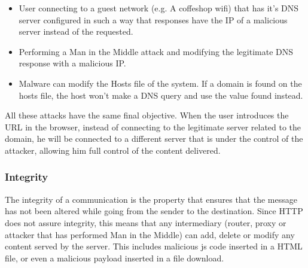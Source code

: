 \begin{itemize}
	\item User connecting to a guest network (e.g. A coffeshop wifi) that has it's DNS server configured in such a way that responses have the IP of a malicious server instead of the requested.
	\item Performing a Man in the Middle attack and modifying the legitimate DNS response with a malicious IP.
	\item Malware can modify the Hosts file of the system. If a domain is found on the hosts file, the host won't make a DNS query and use the value found instead.
\end{itemize}

All these attacks have the same final objective. When the user introduces the URL in the browser, instead of connecting to the legitimate server related to the domain, he will be connected to a different server that is under the control of the attacker, allowing him full control of the content delivered.

\subsubsection{Integrity}
The integrity of a communication is the property that ensures that the message has not been altered while going from the sender to the destination. Since HTTP does not assure integrity, this means that any intermediary (router, proxy or attacker that has performed Man in the Middle) can add, delete or modify any content served by the server. This includes malicious js code inserted in a HTML file, or even a malicious payload inserted in a file download.